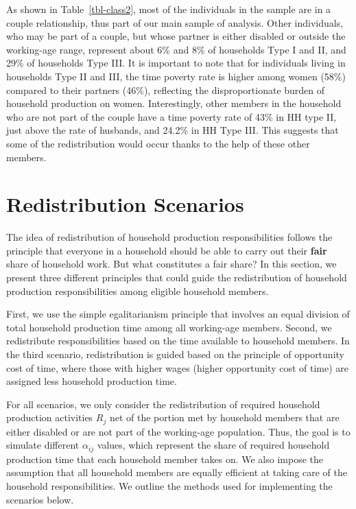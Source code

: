 \documentclass[
  11pt,
]{article}
\begin{document}
As shown in Table~\ref{tbl-class2}, most of the individuals in the
sample are in a couple relationship, thus part of our main sample of
analysis. Other individuals, who may be part of a couple, but whose
partner is either disabled or outside the working-age range, represent
about 6\% and 8\% of households Type I and II, and 29\% of households
Type III. It is important to note that for individuals living in
households Type II and III, the time poverty rate is higher among women
(58\%) compared to their partners (46\%), reflecting the
disproportionate burden of household production on women. Interestingly,
other members in the household who are not part of the couple have a
time poverty rate of 43\% in HH type II, just above the rate of
husbands, and 24.2\% in HH Type III. This suggests that some of the
redistribution would occur thanks to the help of these other members.

\section{Redistribution Scenarios}\label{redistribution-scenarios}

The idea of redistribution of household production responsibilities
follows the principle that everyone in a household should be able to
carry out their \textbf{fair} share of household work. But what
constitutes a fair share? In this section, we present three different
principles that could guide the redistribution of household production
responsibilities among eligible household members.

First, we use the simple egalitarianism principle that involves an equal
division of total household production time among all working-age
members. Second, we redistribute responsibilities based on the time
available to household members. In the third scenario, redistribution is
guided based on the principle of opportunity cost of time, where those
with higher wages (higher opportunity cost of time) are assigned less
household production time.

For all scenarios, we only consider the redistribution of required
household production activities \(R_j\) net of the portion met by
household members that are either disabled or are not part of the
working-age population. Thus, the goal is to simulate different
\(\alpha_{ij}\) values, which represent the share of required household
production time that each household member takes on. We also impose the
assumption that all household members are equally efficient at taking
care of the household responsibilities. We outline the methods used for
implementing the scenarios below.
\end{document}
